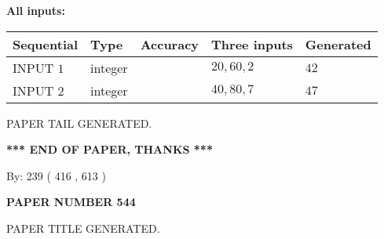 \documentclass{ctexart}
\begin{document}
   
   
   
\noindent\vspace{0.1in}\hspace{-0.08in} {\textbf{\Large{All inputs: }}}
   
   
  
  
\noindent\begin{tabular}{|l|l|l|l|l|}
\hline
 Sequential & Type & Accuracy & Three inputs & Generated \\ 
\hline
 
 
  INPUT $  1 $ & integer &  & $
 20
 , 
 60
 , 
 2
 $ & $ 42 $ 
 \\  \hline  
 
 
  INPUT $  2 $ & integer &  & $
 40
 , 
 80
 , 
 7
 $ & $ 47 $ 
 \\  \hline  
 \end{tabular}
   
   
   
   
   
   
 \vspace{0.2in}
 
   
   
\vspace{2.0in} PAPER TAIL GENERATED.
   
   
   
   
\vspace{1.0in} 
{\textbf{\large{ *** END OF PAPER, THANKS *** }}} 
   
   
\hspace{1.0in} By: 
 239 ( 416 ,  613 )
   
   
   
   
\newpage 
\setcounter{page}{ 
   544001 } 
   
   
   
   
 {\textbf{ \Large{ PAPER NUMBER  544  }}}
   
   
\vspace{0.2in}
   
   
   
   
   
   
   
   
 \vspace{0.2in}
 
 
 
 
   
   
 PAPER TITLE GENERATED.
   
   
   
\vspace{0.2in}
   
\end{document}
